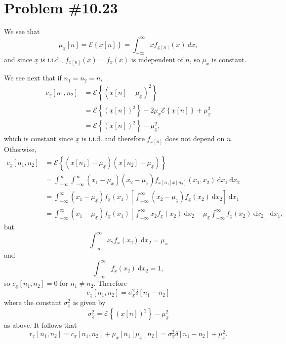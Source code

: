 \documentclass{article}
\begin{document}
\section*{Problem \#10.23}
We see that
$$
\mu_{\underline{x}}[n] = \mathcal{E}\left\{\underline{x}[n]\right\} 
 = \int_{-\infty}^{\infty} x f_{\underline{x}[n]}(x) ~dx,
$$
and since $\underline{x}$ is i.i.d., $f_{\underline{x}[n]}(x) = 
f_{\underline{x}}(x)$ is independent of $n$, so $\mu_{\underline{x}}$
is constant.

We see next that if $n_1 = n_2 = n$,
\begin{align*}
c_{\underline{x}}[n_1, n_2] &= \mathcal{E}\left\{
  (\underline{x}[n] - \mu_{\underline{x}})^2
  \right\} \\
&= \mathcal{E}\left\{(\underline{x}[n])^2\right\}
 - 2\mu_{\underline{x}} \mathcal{E}\left\{\underline{x}[n]\right\}
 + \mu_{\underline{x}}^2 \\
&= \mathcal{E}\left\{(\underline{x}[n])^2\right\} - \mu_{\underline{x}}^2,
\end{align*}
which is constant since $\underline{x}$ is i.i.d. and therefore
$f_{\underline{x}[n]}$ does not depend on $n$.
Otherwise,
\begin{align*}
c_{\underline{x}}[n_1, n_2] &= \mathcal{E}\left\{
  (\underline{x}[n_1] - \mu_{\underline{x}})
  (\underline{x}[n_2] - \mu_{\underline{x}})\right\} \\
&= \int_{-\infty}^{\infty} \int_{-\infty}^{\infty}
     (x_1 - \mu_{\underline{x}})(x_2 - \mu_{\underline{x}}) 
     f_{\underline{x}[n_1]\underline{x}[n_2]}(x_1, x_2) 
     ~\mathrm{d}x_1 
     ~\mathrm{d}x_2 \\
&= \int_{-\infty}^{\infty} 
    (x_1 - \mu_{\underline{x}})f_{\underline{x}}(x_1)
  \left[
    \int_{-\infty}^{\infty}
      (x_2 - \mu_{\underline{x}})f_{\underline{x}}(x_2)
     ~\mathrm{d}x_2
  \right]
     ~\mathrm{d}x_1 \\ 
&= \int_{-\infty}^{\infty} 
    (x_1 - \mu_{\underline{x}})f_{\underline{x}}(x_1)
  \left[
    \int_{-\infty}^{\infty}x_2 f_{\underline{x}}(x_2) 
      ~\mathrm{d}x_2
  - \mu_{\underline{x}}\int_{-\infty}^{\infty} f_{\underline{x}}(x_2)
      ~\mathrm{d}x_2
  \right]
    ~\mathrm{d}x_1,
\end{align*}
but 
$$
\int_{-\infty}^{\infty}x_2 f_{\underline{x}}(x_2) ~\mathrm{d}x_2 =
 \mu_{\underline{x}}
$$
and
$$
\int_{-\infty}^{\infty} f_{\underline{x}}(x_2) ~\mathrm{d}x_2 = 1,
$$
so $c_{\underline{x}}[n_1, n_2] = 0$ for $n_1 \neq n_2$. Therefore
$$
c_{\underline{x}}[n_1, n_2] = \sigma_{\underline{x}}^2 \delta[n_1 - n_2]
$$
where the constant $\sigma_{\underline{x}}^2$ is given by
$$
\sigma_{\underline{x}}^2 = \mathcal{E}\left\{(\underline{x}[n])^2\right\} - \mu_{\underline{x}}^2
$$
as above. It follows that 
$$
r_{\underline{x}}[n_1, n_2] = c_{\underline{x}}[n_1, n_2] 
                            + \mu_{\underline{x}}[n_1]\mu_{\underline{x}}[n_2]
                            = \sigma_{\underline{x}}^2 \delta[n_1 - n_2] + \mu_{\underline{x}}^2.
$$
\end{document}
